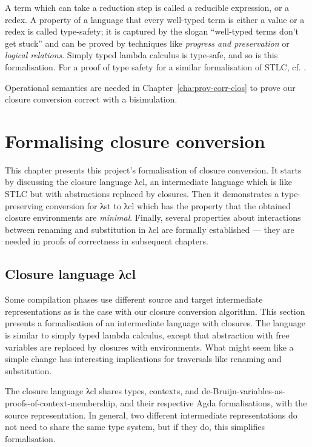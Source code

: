 \documentclass[bsc,frontabs,oneside,singlespacing,parskip,deptreport]{infthesis}
\theoremstyle{definition}
\theoremstyle{lemma}
\begin{document}

A term which can take a reduction step is called a reducible
expression, or a redex. A property of a language that every well-typed
term is either a value or a redex is called type-safety; it is
captured by the slogan ``well-typed terms don't get stuck'' and can be
proved by techniques like \textit{progress and preservation} or
\textit{logical relations}. Simply typed lambda calculus is type-safe,
and so is this formalisation. For a proof of type safety for a similar
formalisation of STLC, cf. \cite{DBLP:conf/sbmf/Wadler18}.

Operational semantics are needed in Chapter~\ref{cha:prov-corr-clos}
to prove our closure conversion correct with a bisimulation.

\chapter{Formalising closure conversion}
\label{cha:agda-development}

This chapter presents this project's formalisation of closure
conversion. It starts by discussing the closure language λcl, an
intermediate language which is like STLC but with abstractions
replaced by closures. Then it demonstrates a type-preserving
conversion for λst to λcl which has the property that the obtained
closure environments are \textit{minimal}.  Finally, several
properties about interactions between renaming and substitution in λcl
are formally established --- they are needed in proofs of correctness
in subsequent chapters.

\section{Closure language λcl}
\label{sec:closure-language-cl}

Some compilation phases use different source and target intermediate
representations as is the case with our closure conversion
algorithm. This section presents a formalisation of an intermediate
language with closures. The language is similar to
simply typed lambda calculus, except that abstraction with free
variables are replaced by closures with environments. What might seem
like a simple change has interesting implications for traversals like
renaming and substitution.

The closure language λcl shares types, contexts, and
de-Bruijn-variables-as-proofs-of-context-membership, and their
respective Agda formalisations, with the source representation. In
general, two different intermediate representations do not need to
share the same type system, but if they do, this simplifies
formalisation.
\end{document}
